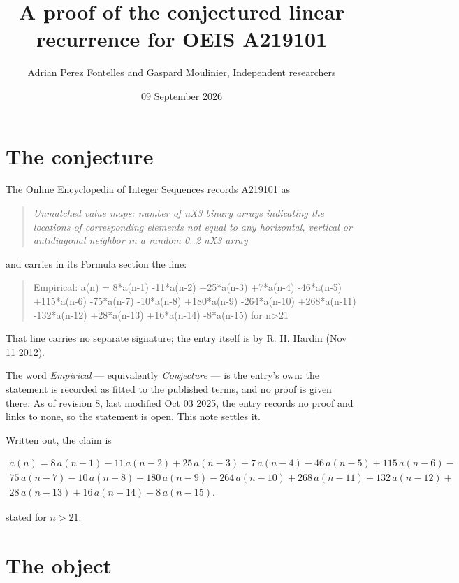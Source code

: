 \documentclass[11pt]{article}
\title{A proof of the conjectured linear recurrence for OEIS A219101}
\author{Adrian Perez Fontelles and Gaspard Moulinier, Independent researchers}
\date{09 September 2026}
\theoremstyle{definition}
\begin{document}
\maketitle
\section{The conjecture}

The Online Encyclopedia of Integer Sequences records \href{https://oeis.org/A219101}{A219101} as

\begin{quote}\itshape Unmatched value maps: number of nX3 binary arrays indicating the locations of corresponding elements not equal to any horizontal, vertical or antidiagonal neighbor in a random 0..2 nX3 array\end{quote}

and carries in its Formula section the line:

\begin{quote}\ttfamily Empirical: a(n) = 8*a(n-1) -11*a(n-2) +25*a(n-3) +7*a(n-4) -46*a(n-5) +115*a(n-6) -75*a(n-7) -10*a(n-8) +180*a(n-9) -264*a(n-10) +268*a(n-11) -132*a(n-12) +28*a(n-13) +16*a(n-14) -8*a(n-15) for n>21\end{quote}

That line carries no separate signature; the entry itself is by R. H. Hardin (Nov 11 2012).

The word {\itshape Empirical} --- equivalently {\itshape Conjecture} --- is the entry's own: the statement is recorded as fitted to the published terms, and no proof is given there. As of revision 8, last modified Oct 03 2025, the entry records no proof and links to none, so the statement is open. This note settles it.

Written out, the claim is

\begin{multline*} a(n) = 8\,a(n-1) - 11\,a(n-2) + 25\,a(n-3) + 7\,a(n-4) - 46\,a(n-5) + 115\,a(n-6) - \\ 75\,a(n-7) - 10\,a(n-8) + 180\,a(n-9) - 264\,a(n-10) + 268\,a(n-11) - 132\,a(n-12) + \\ 28\,a(n-13) + 16\,a(n-14) - 8\,a(n-15). \end{multline*}

stated for $n > 21$.

\section{The object}
\end{document}
